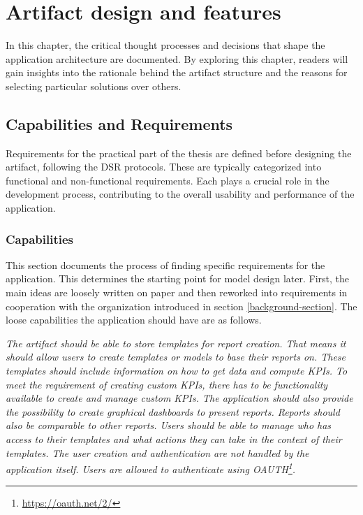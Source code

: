 \chapter{Artifact design and features}
\label{Chapter5} 

In this chapter, the critical thought processes and decisions 
that shape the application architecture are documented. 
By exploring this chapter, readers will gain insights into the rationale behind the artifact structure and the reasons for selecting particular solutions over others.

\section{Capabilities and Requirements} 
\label{Requirements}

Requirements for the practical part of the thesis are defined before designing the artifact, following the DSR protocols. 
These are typically categorized into functional and non-functional requirements. 
Each plays a crucial role in the development process, 
contributing to the overall usability and performance of the application.

\subsection{Capabilities}

This section documents the process of finding specific requirements for the application.
This determines the starting point for model design later.
First, the main ideas are loosely written on paper and then reworked into 
requirements in cooperation with the organization introduced in section \ref{background-section}. 
The loose capabilities the application should have are as follows.

\textit{The artifact should be able to store templates for report creation. 
That means it should allow users to create templates or models to base their reports on. 
These templates should include information on how to get data and compute KPIs. 
To meet the requirement of creating custom KPIs, there has to be functionality available to create and manage custom KPIs.
The application should also provide the possibility to create graphical dashboards to 
present reports. 
Reports should also be comparable to other reports. 
Users should be able to manage who has access to their templates 
and what actions they can take in the context of their templates. 
The user creation and authentication are not handled by the application itself. 
Users are allowed to authenticate using OAUTH\footnote{\url{https://oauth.net/2/}}.
}

